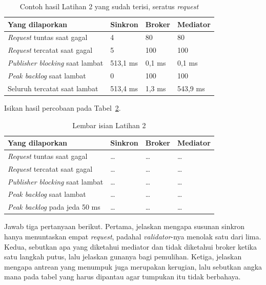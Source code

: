\begin{table}[htbp]
  \centering
  \caption{Contoh hasil Latihan 2 yang sudah terisi, seratus \textit{request}}
  \label{tab:lat2event-contoh}
  \begin{tabularx}{\textwidth}{|X|l|l|l|}
    \hline
    \textbf{Yang dilaporkan} & \textbf{Sinkron} & \textbf{Broker} & \textbf{Mediator} \\
    \hline
    \textit{Request} tuntas saat gagal & 4 & 80 & 80 \\
    \hline
    \textit{Request} tercatat saat gagal & 5 & 100 & 100 \\
    \hline
    \textit{Publisher blocking} saat lambat & 513,1 ms & 0,1 ms & 0,1 ms \\
    \hline
    \textit{Peak backlog} saat lambat & 0 & 100 & 100 \\
    \hline
    Seluruh tercatat saat lambat & 513,4 ms & 1,3 ms & 543,9 ms \\
    \hline
  \end{tabularx}
\end{table}

Isikan hasil percobaan pada Tabel~\ref{tab:lat2event-hasil}.

\begin{table}[htbp]
  \centering
  \caption{Lembar isian Latihan 2}
  \label{tab:lat2event-hasil}
  \begin{tabularx}{\textwidth}{|X|l|l|l|}
    \hline
    \textbf{Yang dilaporkan} & \textbf{Sinkron} & \textbf{Broker} & \textbf{Mediator} \\
    \hline
    \textit{Request} tuntas saat gagal & \dots & \dots & \dots \\
    \hline
    \textit{Request} tercatat saat gagal & \dots & \dots & \dots \\
    \hline
    \textit{Publisher blocking} saat lambat & \dots & \dots & \dots \\
    \hline
    \textit{Peak backlog} saat lambat & \dots & \dots & \dots \\
    \hline
    \textit{Peak backlog} pada jeda 50 ms & \dots & \dots & \dots \\
    \hline
  \end{tabularx}
\end{table}

Jawab tiga pertanyaan berikut. Pertama, jelaskan mengapa susunan sinkron hanya
menuntaskan empat \textit{request}, padahal \textit{validator}-nya menolak satu dari lima.
Kedua, sebutkan apa yang diketahui mediator dan tidak diketahui broker ketika
satu langkah putus, lalu jelaskan gunanya bagi pemulihan. Ketiga, jelaskan
mengapa antrean yang menumpuk juga merupakan kerugian, lalu sebutkan angka mana
pada tabel yang harus dipantau agar tumpukan itu tidak berbahaya.

